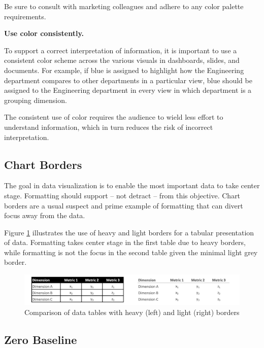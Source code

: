\documentclass[
]{book}
\begin{document}
Be sure to consult with marketing colleagues and adhere to any color palette requirements.

\textbf{Use color consistently.}

To support a correct interpretation of information, it is important to use a consistent color scheme across the various visuals in dashboards, slides, and documents. For example, if blue is assigned to highlight how the Engineering department compares to other departments in a particular view, blue should be assigned to the Engineering department in every view in which department is a grouping dimension.

The consistent use of color requires the audience to wield less effort to understand information, which in turn reduces the risk of incorrect interpretation.

\hypertarget{chart-borders}{%
\subsection{Chart Borders}\label{chart-borders}}

The goal in data visualization is to enable the most important data to take center stage. Formatting should support -- not detract -- from this objective. Chart borders are a usual suspect and prime example of formatting that can divert focus away from the data.

Figure \ref{fig:chart-borders} illustrates the use of heavy and light borders for a tabular presentation of data. Formatting takes center stage in the first table due to heavy borders, while formatting is not the focus in the second table given the minimal light grey border.

\begin{figure}

{\centering \includegraphics[width=0.75\linewidth]{graphics/light_heavy_borders} 

}

\caption{Comparison of data tables with heavy (left) and light (right) borders}\label{fig:chart-borders}
\end{figure}

\hypertarget{zero-baseline}{%
\subsection{Zero Baseline}\label{zero-baseline}}
\end{document}

